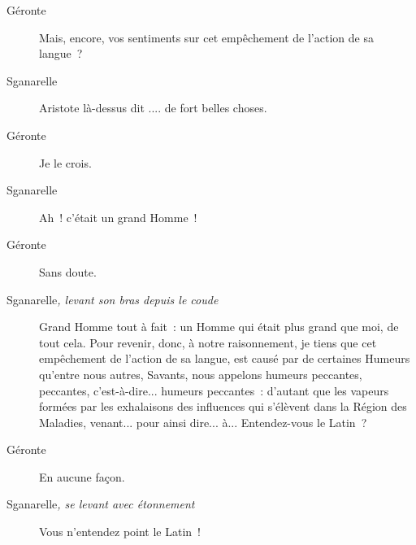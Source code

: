 \documentclass[french,twoside]{book} %
\begin{document}
 \begin{description} \item[Géronte] 

Mais, encore, vos sentiments sur cet empêchement de l’action de sa langue ?\end{description}
 \begin{description} \item[Sganarelle] 

Aristote là-dessus dit .... de fort belles choses.\end{description}
 \begin{description} \item[Géronte] 

Je le crois.\end{description}
 \begin{description} \item[Sganarelle] 

Ah ! c’était un grand Homme !\end{description}
 \begin{description} \item[Géronte] 

Sans doute.\end{description}
 \begin{description} \item[Sganarelle\textit{, levant son bras depuis le coude}\par
] 

Grand Homme tout à fait : un Homme qui était plus grand que moi, de tout cela. Pour revenir, donc, à notre raisonnement, je tiens que cet empêchement de l’action de sa langue, est causé par de certaines Humeurs qu’entre nous autres, Savants, nous appelons humeurs peccantes, peccantes, c’est-à-dire... humeurs peccantes : d’autant que les vapeurs formées par les exhalaisons des influences qui s’élèvent dans la Région des Maladies, venant... pour ainsi dire... à... Entendez-vous le Latin ?\end{description}
 \begin{description} \item[Géronte] 

En aucune façon.\end{description}
 \begin{description} \item[Sganarelle\textit{, se levant avec étonnement}\par
] 

Vous n’entendez point le Latin !\end{description}
\end{document}
